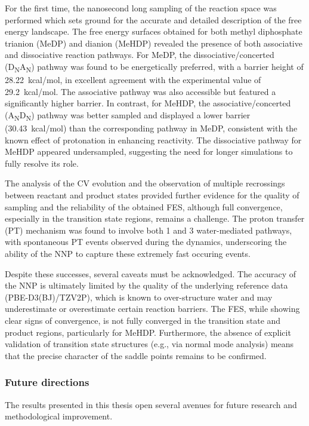 For the first time, the nanosecond long sampling of the reaction space was performed which sets ground for the accurate and detailed description of the free energy landscape. The free energy surfaces obtained for both methyl diphosphate trianion (MeDP) and dianion (MeHDP) revealed the presence of both associative and dissociative reaction pathways. For MeDP, the dissociative/concerted (D\textsubscript{N}A\textsubscript{N}) pathway was found to be energetically preferred, with a barrier height of 28.22~kcal/mol, in excellent agreement with the experimental value of 29.2~kcal/mol. The associative pathway was also accessible but featured a significantly higher barrier. In contrast, for MeHDP, the associative/concerted (A\textsubscript{N}D\textsubscript{N}) pathway was better sampled and displayed a lower barrier (30.43~kcal/mol) than the corresponding pathway in MeDP, consistent with the known effect of protonation in enhancing reactivity. The dissociative pathway for MeHDP appeared undersampled, suggesting the need for longer simulations to fully resolve its role.

The analysis of the CV evolution and the observation of multiple recrossings between reactant and product states provided further evidence for the quality of sampling and the reliability of the obtained FES, although full convergence, especially in the transition state regions, remains a challenge. The proton transfer (PT) mechanism was found to involve both 1 and 3 water-mediated pathways, with spontaneous PT events observed during the dynamics, underscoring the ability of the NNP to capture these extremely fast occuring events.

Despite these successes, several caveats must be acknowledged. The accuracy of the NNP is ultimately limited by the quality of the underlying reference data (PBE-D3(BJ)/TZV2P), which is known to over-structure water and may underestimate or overestimate certain reaction barriers. The FES, while showing clear signs of convergence, is not fully converged in the transition state and product regions, particularly for MeHDP. Furthermore, the absence of explicit validation of transition state structures (e.g., via normal mode analysis) means that the precise character of the saddle points remains to be confirmed.

\subsubsection{Future directions}
The results presented in this thesis open several avenues for future research and methodological improvement.

